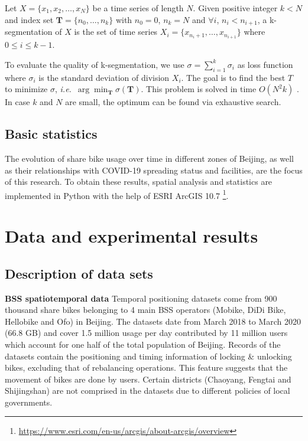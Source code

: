 \documentclass[ijgi,submit,moreauthors,pdftex]{Definitions/mdpi}
\begin{document}
\begin{Definition}[k-segmentation]\label{def:k-seg}
Let $X=\{x_1,x_2,\ldots,x_N\}$ be a time series of length $N$.
Given positive integer $k<N$ and index set $\mathbf{T}=\{n_0,\ldots,n_k\}$ with $n_0=0$, $n_k=N$ and $\forall i$, $n_i<n_{i+1}$, a k-segmentation of $X$ is the set of time series $X_i=\{x_{n_i+1},\ldots,x_{n_{i+1}}\}$ where $0\leq i\leq k-1$.
\end{Definition}

To evaluate the quality of k-segmentation, we use $\sigma=\sum_{i=1}^{k}{\sigma_i}$ as loss function where $\sigma_i$ is the standard deviation of division $X_i$. 
The goal is to find the best $T$ to minimize $\sigma$, \textit{i.e.}\ $\arg\min_{\mathbf{T}}\sigma(\mathbf{T})$.
This problem is solved in time $O(N^2k)$ \cite{terzi2006efficient}.
In case $k$ and $N$ are small, the optimum can be found via exhaustive search.

\subsection{Basic statistics}
The evolution of share bike usage over time in different zones of Beijing, as well as their relationships with COVID-19 spreading status and facilities, are the focus of this research.
To obtain these results, spatial analysis and statistics are implemented in Python with the help of ESRI ArcGIS 10.7 \footnote{\url{https://www.esri.com/en-us/arcgis/about-arcgis/overview}}. 

\section{Data and experimental results}
\subsection{Description of data sets}
\textbf{BSS spatiotemporal data} Temporal positioning datasets come from 900 thousand share bikes belonging to 4 main BSS operators (Mobike, DiDi Bike, Hellobike and Ofo) in Beijing.
The datasets date from March 2018 to March 2020 (66.8 GB) and cover 1.5 million usage per day contributed by 11 million users which account for one half of the total population of Beijing.
Records of the datasets contain the positioning and timing information of locking \& unlocking bikes, excluding that of rebalancing operations.
This feature suggests that the movement of bikes are done by users.
Certain districts (Chaoyang, Fengtai and Shijingshan) are not comprised in the datasets due to different policies of local governments.
\end{document}
